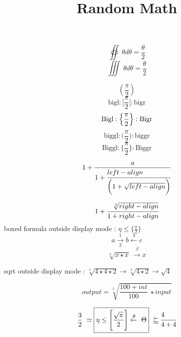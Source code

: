 \documentclass{article}
\title{Random Math}
\begin{document}
\maketitle
$$\oiint ~\theta{}d\theta = \frac{\theta}{2}$$
$$\iiint ~\theta{}d\theta = \frac{\theta}{2}$$

$$(\frac{\pi}{2})$$
$$\textrm{bigl} : \bigl[ \frac{\pi}{2} \bigr] : \textrm{bigr}$$
$$\textrm{Bigl} : \Bigl\{ \frac{\pi}{2}\Bigr\} : \textrm{Bigr}$$
$$\textrm{biggl} : \biggl( \frac{\pi}{2}\biggr) : \textrm{biggr}$$
$$\textrm{Biggl} : \Biggl\{ \frac{\pi}{2} \Biggr\} : \textrm{Biggr}$$

$$1+\frac{a}{1+\cfrac[l]{left-align}{\biggl(1 + \sqrt{left-align}\biggr)}}$$

$$1+\cfrac[r]{\sqrt[5]{right-align}}{1 + right-align}$$
boxed formula outside display mode : $\boxed{\eta \leq \bigl\{\frac{\pi}{2}\bigr\}}$
$$a \xrightarrow[2]{1} b \xleftarrow{3} c$$
$$\sqrt[3]{x \star x}~\xrightarrow{\beta} x$$

sqrt outside display mode : $\sqrt[5]{4 \star 4 \star 2} \to \sqrt[3]{4 \star 2}\to \sqrt{4}$

$$output = \sqrt[5]{\frac{100+int}{100} ~\star input}$$

$$\frac{3}{2} ~\simeq \boxed{\eta \leq \Biggl[\frac{\sqrt{\pi}}{2}\Biggr] \xleftarrow{\theta} ~\Theta} ~\succapprox \cfrac[l]{4}{4+4}$$
\end{document}
